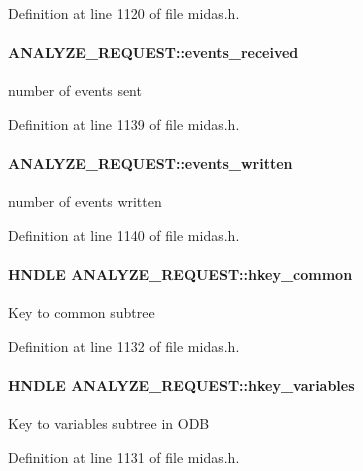 Definition at line 1120 of file midas.h.
\paragraph[{events\_\-received}]{ {\bf ANALYZE\_\-REQUEST::events\_\-received}}\hfill\label{structANALYZE__REQUEST_abf605e9e770da11f91f501febd274aad}
number of events sent 

Definition at line 1139 of file midas.h.
\paragraph[{events\_\-written}]{ {\bf ANALYZE\_\-REQUEST::events\_\-written}}\hfill\label{structANALYZE__REQUEST_aeaa47cc2392bfdc8a1ee1a459082c876}
number of events written 

Definition at line 1140 of file midas.h.
\paragraph[{hkey\_\-common}]{\setlength{\rightskip}{0pt plus 5cm}HNDLE {\bf ANALYZE\_\-REQUEST::hkey\_\-common}}\hfill\label{structANALYZE__REQUEST_a7c9dd18e861558a006b694b3c9f197a1}
Key to common subtree 

Definition at line 1132 of file midas.h.
\paragraph[{hkey\_\-variables}]{\setlength{\rightskip}{0pt plus 5cm}HNDLE {\bf ANALYZE\_\-REQUEST::hkey\_\-variables}}\hfill\label{structANALYZE__REQUEST_a4da294a6f7f01e5521cbb0933c7f5b40}
Key to variables subtree in ODB 

Definition at line 1131 of file midas.h.
